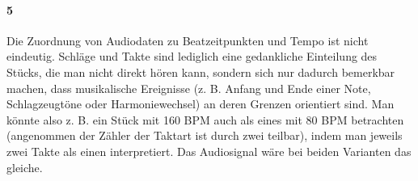 {	\paragraph{5}  %
	{
		Die Zuordnung von Audiodaten zu Beatzeitpunkten und Tempo ist nicht eindeutig.
		Schläge und Takte sind lediglich eine gedankliche Einteilung des Stücks,
			die man nicht direkt hören kann,
			sondern sich nur dadurch bemerkbar machen,
			dass musikalische Ereignisse
			(z. B. Anfang und Ende einer Note, Schlagzeugtöne oder Harmoniewechsel)
			an deren Grenzen orientiert sind.
		Man könnte also z. B. ein Stück mit 160 \ac{BPM} auch als eines mit 80 \ac{BPM} betrachten
			(angenommen der Zähler der Taktart ist durch zwei teilbar),
			indem man jeweils zwei Takte als einen interpretiert.
		Das Audiosignal wäre bei beiden Varianten das gleiche.
	}


}
